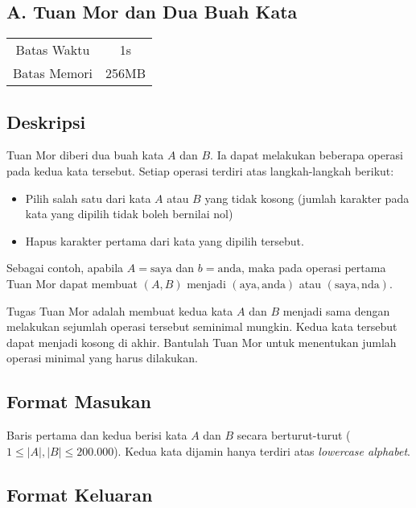 \documentclass{article}
\begin{document}
\begin{center}
    \section*{A. Tuan Mor dan Dua Buah Kata}

    \begin{tabular}{ | c c | }
        \hline
        Batas Waktu  & 1s \\  
        Batas Memori & 256MB \\
        \hline
    \end{tabular}
\end{center}

\subsection*{Deskripsi}

Tuan Mor diberi dua buah kata $A$ dan $B$. Ia dapat melakukan beberapa operasi pada kedua kata tersebut. Setiap operasi terdiri atas langkah-langkah berikut:

\begin{itemize}
    \setlength\itemsep{0pt}
    \item Pilih salah satu dari kata $A$ atau $B$ yang tidak kosong (jumlah karakter pada kata yang dipilih tidak boleh bernilai nol)
    \item Hapus karakter pertama dari kata yang dipilih tersebut.
\end{itemize}

Sebagai contoh, apabila $A = \text{saya}$ dan $b = \text{anda}$, maka pada operasi pertama Tuan Mor dapat membuat $(A,B)$ menjadi $(\text{aya}, \text{anda})$ atau $(\text{saya}, \text{nda})$.

Tugas Tuan Mor adalah membuat kedua kata $A$ dan $B$ menjadi sama dengan melakukan sejumlah operasi tersebut seminimal mungkin. Kedua kata tersebut dapat menjadi kosong di akhir. Bantulah Tuan Mor untuk menentukan jumlah operasi minimal yang harus dilakukan.

\subsection*{Format Masukan}

Baris pertama dan kedua berisi kata $A$ dan $B$ secara berturut-turut ($1 \leq |A|, |B| \leq 200.000$). Kedua kata dijamin hanya terdiri atas \textit{lowercase alphabet}.  

\subsection*{Format Keluaran}
\end{document}
